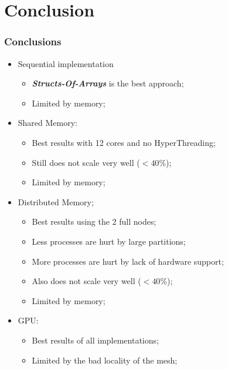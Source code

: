 \section{Conclusion}

\begin{frame}
	\frametitle{Conclusions}

	\begin{itemize}
		\item Sequential implementation
		\begin{itemize}
			\item \textbf{\itshape Structs-Of-Arrays} is the best approach;
			\item Limited by memory;
		\end{itemize}
		\item Shared Memory:
		\begin{itemize}
			\item Best results with 12 cores and no HyperThreading;
			\item Still does not scale very well ($<40\%$);
			\item Limited by memory;
		\end{itemize}
		\item Distributed Memory;
		\begin{itemize}
			\item Best results using the 2 full nodes;
			\item Less processes are hurt by large partitions;
			\item More processes are hurt by lack of hardware support;
			\item Also does not scale very well ($<40\%$);
			\item Limited by memory;
		\end{itemize}
		\item GPU:
		\begin{itemize}
			\item Best results of all implementations;
			\item Limited by the bad locality of the mesh;
		\end{itemize}
	\end{itemize}
\end{frame}

